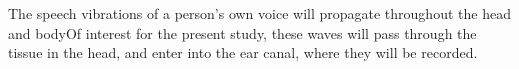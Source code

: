 
\DIFaddend The speech vibrations of a person's own voice will propagate throughout the head and body\DIFdelbegin {}\DIFdelend \DIFaddbegin {}\DIFaddend Of interest for the present study, these waves will pass through the tissue in the head, and enter into the ear canal, where they will be recorded. %

